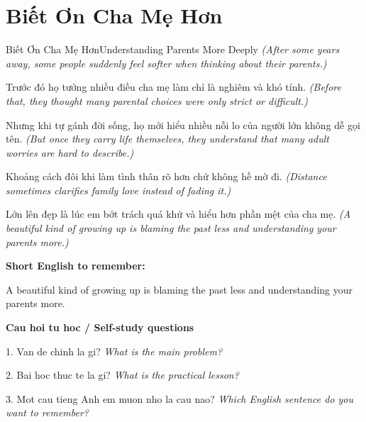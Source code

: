 \section{Biết Ơn Cha Mẹ Hơn}
\begin{truyen}{Biết Ơn Cha Mẹ Hơn}{Understanding Parents More Deeply}
\textit{(After some years away, some people suddenly feel softer when thinking about their parents.)}

Trước đó họ tưởng nhiều điều cha mẹ làm chỉ là nghiêm và khó tính.
\textit{(Before that, they thought many parental choices were only strict or difficult.)}

Nhưng khi tự gánh đời sống, họ mới hiểu nhiều nỗi lo của người lớn không dễ gọi tên.
\textit{(But once they carry life themselves, they understand that many adult worries are hard to describe.)}

Khoảng cách đôi khi làm tình thân rõ hơn chứ không hề mờ đi.
\textit{(Distance sometimes clarifies family love instead of fading it.)}

\end{truyen}

\begin{baihoc}
Lớn lên đẹp là lúc em bớt trách quá khứ và hiểu hơn phần mệt của cha mẹ.
\textit{(A beautiful kind of growing up is blaming the past less and understanding your parents more.)}
\end{baihoc}

\begin{ghinhoanh}
\textbf{Short English to remember:}

A beautiful kind of growing up is blaming the past less and understanding your parents more.

\end{ghinhoanh}

\begin{tuhocnhanh}
\textbf{Cau hoi tu hoc / Self-study questions}

1. Van de chinh la gi? \textit{What is the main problem?}

2. Bai hoc thuc te la gi? \textit{What is the practical lesson?}

3. Mot cau tieng Anh em muon nho la cau nao? \textit{Which English sentence do you want to remember?}
\end{tuhocnhanh}
